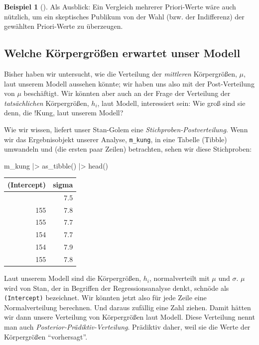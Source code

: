 \documentclass[
  ngerman,
  letterpaper,
  twoside,
  open=any]{scrbook}
\newenvironment{Shaded}{\begin{snugshade}}{\end{snugshade}}
\newcommand{\FunctionTok}[1]{\textcolor[rgb]{0.28,0.35,0.67}{#1}}
\newcommand{\NormalTok}[1]{\textcolor[rgb]{0.00,0.23,0.31}{#1}}
\newcommand{\SpecialCharTok}[1]{\textcolor[rgb]{0.37,0.37,0.37}{#1}}
\newcounter{none} %
\theoremstyle{definition}
\newtheorem{example}{Beispiel}[chapter]
\theoremstyle{plain}
\theoremstyle{definition}
\theoremstyle{definition}
\theoremstyle{remark}
\begin{document}
\begin{example}[]
Als Ausblick: Ein Vergleich mehrerer Priori-Werte wäre auch nützlich, um
ein skeptisches Publikum von der Wahl (bzw. der Indifferenz) der
gewählten Priori-Werte zu überzeugen.

\subsection{Welche Körpergrößen erwartet unser
Modell}\label{welche-kuxf6rpergruxf6uxdfen-erwartet-unser-modell}

Bisher haben wir untersucht, wie die Verteilung der \emph{mittleren}
Körpergrößen, \(\mu\), laut unserem Modell aussehen könnte; wir haben
uns also mit der Post-Verteilung von \(\mu\) beschäftigt. Wir könnten
aber auch an der Frage der Verteilung der \emph{tatsächlichen}
Körpergrößen, \(h_i\), laut Modell, interessiert sein: Wie groß sind sie
denn, die !Kung, laut unserem Modell?

Wie wir wissen, liefert unser Stan-Golem eine
\emph{Stichproben-Postverteilung}. Wenn wir das Ergebnisobjekt unserer
Analyse, \texttt{m\_kung}, in eine Tabelle (Tibble) umwandeln und (die
ersten paar Zeilen) betrachten, sehen wir diese Stichproben:

\begin{Shaded}
\begin{Highlighting}[]
\NormalTok{m\_kung }\SpecialCharTok{|\textgreater{}} \FunctionTok{as\_tibble}\NormalTok{() }\SpecialCharTok{|\textgreater{}} \FunctionTok{head}\NormalTok{()}
\end{Highlighting}
\end{Shaded}

{\def\LTcaptype{none} %
\begin{longtable}[]{@{}rr@{}}
\toprule\noalign{}
(Intercept) & sigma \\
\midrule\noalign{}
\endhead
\bottomrule\noalign{}
\endlastfoot
154 & 7.5 \\
155 & 7.8 \\
155 & 7.7 \\
154 & 7.7 \\
154 & 7.9 \\
155 & 7.8 \\
\end{longtable}
}

Laut unserem Modell sind die Körpergrößen, \(h_i\), normalverteilt mit
\(\mu\) und \(\sigma\). \(\mu\) wird von Stan, der in Begriffen der
Regressionsanalyse denkt, schnöde als \texttt{(Intercept)} bezeichnet.
Wir könnten jetzt also für jede Zeile eine Normalverteilung berechnen.
Und daraus zufällig eine Zahl ziehen. Damit hätten wir dann unsere
Verteilung von Körpergrößen laut Modell. Diese Verteilung nennt man auch
\emph{Posterior-Prädiktiv-Verteilung}. Prädiktiv daher, weil sie die
Werte der Körpergrößen \enquote{vorhersagt}.


\end{example}
\end{document}
